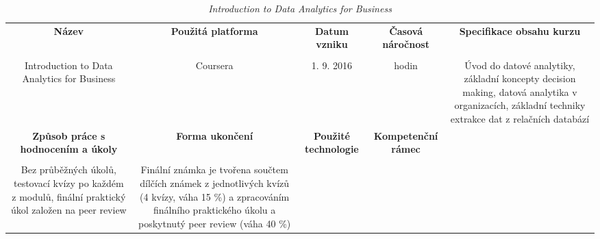 \begin{landscape}

\begin{table}[htbp]

\renewcommand\thetable{1}

\caption{\textit{Introduction to Data Analytics for Business}}\label{tab1}

\footnotesize

{

\justifying

\begin{tabularx}{\linewidth}{CCCCC}

\toprule

\textbf{Název} &

\textbf{Použitá platforma} &

\textbf{Datum vzniku} &

\textbf{Časová náročnost} &
 
\textbf{Specifikace obsahu kurzu}

\\

\tabularnewline
\midrule

Introduction to Data Analytics for Business

&

Coursera

&

1. 9. 2016

&

 hodin

&

Úvod do datové analytiky, základní koncepty decision making, datová analytika v organizacích, základní techniky extrakce dat z relačních databází

\\
\toprule

\textbf{Způsob práce s hodnocením a úkoly} &

\textbf{Forma ukončení} &


\textbf{Použité technologie} &

\textbf{Kompetenční rámec} 

\\

\tabularnewline
\midrule

Bez průběžných úkolů, testovací kvízy po každém z modulů, finální praktický úkol založen na peer review

&

Finální známka je tvořena součtem dílčích známek z jednotlivých kvízů (4 kvízy, váha 15 \%) a zpracováním finálního praktického úkolu a poskytnutý peer review (váha 40 \%)


\end{tabularx}}
\end{table}
\end{landscape}
